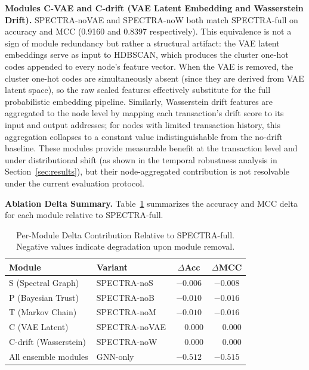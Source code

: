 \noindent\textbf{Modules C-VAE and C-drift (VAE Latent Embedding and
Wasserstein Drift).}
SPECTRA-noVAE and SPECTRA-noW both match SPECTRA-full on accuracy and MCC
(0.9160 and 0.8397 respectively).
This equivalence is not a sign of module redundancy but rather a structural
artifact: the VAE latent embeddings serve as input to HDBSCAN, which
produces the cluster one-hot codes appended to every node's feature vector.
When the VAE is removed, the cluster one-hot codes are simultaneously absent
(since they are derived from VAE latent space), so the raw scaled features
effectively substitute for the full probabilistic embedding pipeline.
Similarly, Wasserstein drift features are aggregated to the node level by
mapping each transaction's drift score to its input and output addresses;
for nodes with limited transaction history, this aggregation collapses to a
constant value indistinguishable from the no-drift baseline.
These modules provide measurable benefit at the transaction level and under
distributional shift (as shown in the temporal robustness analysis in
Section~\ref{sec:results}), but their node-aggregated contribution is not
resolvable under the current evaluation protocol.

\noindent\textbf{Ablation Delta Summary.}
Table~\ref{tab:ablation_delta} summarizes the accuracy and MCC delta for
each module relative to SPECTRA-full.

\begin{table}[t]
  \centering
  \renewcommand{\arraystretch}{1.15}
  \caption{Per-Module Delta Contribution Relative to SPECTRA-full.
           Negative values indicate degradation upon module removal.}
  \label{tab:ablation_delta}
  \begin{tabular}{@{}llcc@{}}
    \toprule
    \textbf{Module} & \textbf{Variant} & $\Delta$\textbf{Acc} & $\Delta$\textbf{MCC} \\
    \midrule
    S  (Spectral Graph)       & SPECTRA-noS   & $-0.006$ & $-0.008$ \\
    P  (Bayesian Trust)       & SPECTRA-noB   & $-0.010$ & $-0.016$ \\
    T  (Markov Chain)         & SPECTRA-noM   & $-0.010$ & $-0.016$ \\
    C  (VAE Latent)           & SPECTRA-noVAE & $\phantom{-}0.000$ & $\phantom{-}0.000$ \\
    C-drift (Wasserstein)     & SPECTRA-noW   & $\phantom{-}0.000$ & $\phantom{-}0.000$ \\
    \midrule
    All ensemble modules      & GNN-only      & $-0.512$ & $-0.515$ \\
    \bottomrule
  \end{tabular}
\end{table}

